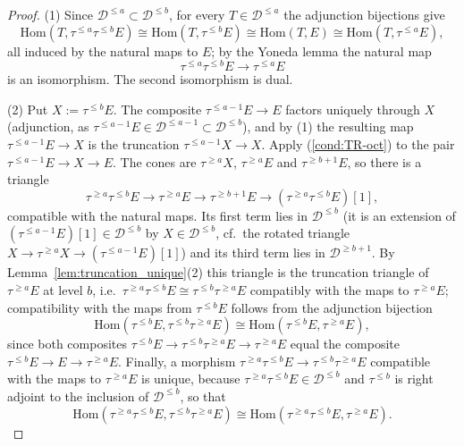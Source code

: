 \documentclass[12pt]{amsart}
\newcommand{\condref}[1]{\textup{(\ref{#1})}}
\numberwithin{theorem}{section}
\theoremstyle{definition}
\newcommand{\Hom}{\mathrm{Hom}}
\newcommand{\calD}{\mathcal{D}}
\newcommand{\Dle}[1]{\calD^{\leqslant #1}}
\newcommand{\Dge}[1]{\calD^{\geqslant #1}}
\begin{document}
	\begin{proof}
		(1) Since $\Dle{a} \subset \Dle{b}$, for every $T \in \Dle{a}$ the adjunction bijections give
		\[
		\Hom(T, \tau^{\leqslant a} \tau^{\leqslant b} E) \cong \Hom(T, \tau^{\leqslant b} E) \cong \Hom(T, E) \cong \Hom(T, \tau^{\leqslant a} E) ,
		\]
		all induced by the natural maps to $E$;
		by the Yoneda lemma the natural map 
		\[
		\tau^{\leqslant a} \tau^{\leqslant b} E \to \tau^{\leqslant a} E
		\] 
		is an isomorphism.
		The second isomorphism is dual.
		
		(2) Put $X := \tau^{\leqslant b} E$.
		The composite $\tau^{\leqslant a-1} E \to E$ factors uniquely through $X$ 
		(adjunction, as $\tau^{\leqslant a-1} E \in \Dle{a-1} \subset \Dle{b}$), 
		and by (1) the resulting map $\tau^{\leqslant a-1} E \to X$ is the truncation 
		$\tau^{\leqslant a-1} X \to X$.
		Apply \condref{cond:TR-oct} to the pair $\tau^{\leqslant a-1} E \to X \to E$.
		The cones are $\tau^{\geqslant a} X$, $\tau^{\geqslant a} E$ and $\tau^{\geqslant b+1} E$, so there is a triangle
		\[
		\tau^{\geqslant a} \tau^{\leqslant b} E \longrightarrow \tau^{\geqslant a} E \longrightarrow \tau^{\geqslant b+1} E \longrightarrow (\tau^{\geqslant a} \tau^{\leqslant b} E)[1] ,
		\]
		compatible with the natural maps.
		Its first term lies in $\Dle{b}$ (it is an extension of $(\tau^{\leqslant a-1} E)[1] \in \Dle{b}$ by $X \in \Dle{b}$, cf.\ the rotated triangle $X \to \tau^{\geqslant a} X \to (\tau^{\leqslant a-1} E)[1]$) and its third term lies in $\Dge{b+1}$.
		By Lemma~\ref{lem:truncation_unique}(2) this triangle is the truncation triangle of $\tau^{\geqslant a} E$ at level $b$, i.e.\ $\tau^{\geqslant a} \tau^{\leqslant b} E \cong \tau^{\leqslant b} \tau^{\geqslant a} E$ compatibly with the maps to $\tau^{\geqslant a} E$;
		compatibility with the maps from $\tau^{\leqslant b} E$ follows from the adjunction bijection 
		\[
		\Hom(\tau^{\leqslant b} E, \tau^{\leqslant b} \tau^{\geqslant a} E) \cong \Hom(\tau^{\leqslant b} E, \tau^{\geqslant a} E),
		\] 
		since both composites $\tau^{\leqslant b} E \to \tau^{\leqslant b} \tau^{\geqslant a} E \to \tau^{\geqslant a} E$ equal the composite $\tau^{\leqslant b} E \to E \to \tau^{\geqslant a} E$.
		Finally, a morphism $\tau^{\geqslant a} \tau^{\leqslant b} E \to \tau^{\leqslant b} \tau^{\geqslant a} E$ compatible with the maps to $\tau^{\geqslant a} E$ is unique, because $\tau^{\geqslant a} \tau^{\leqslant b} E \in \Dle{b}$ and $\tau^{\leqslant b}$ is right adjoint to the inclusion of $\Dle{b}$, so that 
		\[
		\Hom(\tau^{\geqslant a} \tau^{\leqslant b} E, \tau^{\leqslant b} \tau^{\geqslant a} E) \cong \Hom(\tau^{\geqslant a} \tau^{\leqslant b} E, \tau^{\geqslant a} E).
		\]
	\end{proof}
	
\end{document}
